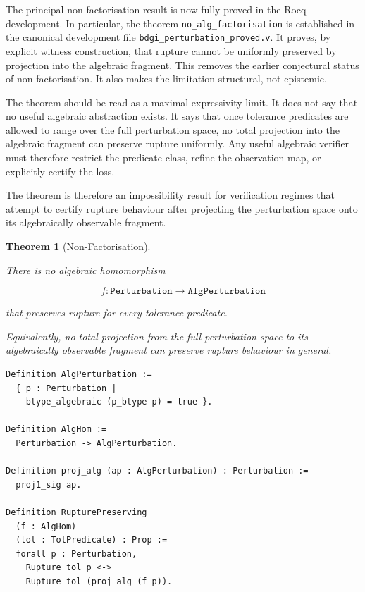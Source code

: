 \documentclass[pdflatex,sn-mathphys-num]{sn-jnl}
\theoremstyle{plain}
\newtheorem{theorem}{Theorem}[section]
\theoremstyle{definition}
\theoremstyle{remark}
\begin{document}
The principal non-factorisation result is now fully proved in the Rocq
development.
In particular, the theorem \texttt{no\_alg\_factorisation} is
established in the canonical development file
\texttt{bdgi\_perturbation\_proved.v}.
It proves, by explicit witness construction, that rupture cannot be
uniformly preserved by projection into the algebraic fragment.
This removes the earlier conjectural status of non-factorisation.
It also makes the limitation structural, not epistemic.

The theorem should be read as a maximal-expressivity limit.
It does not say that no useful algebraic abstraction exists.
It says that once tolerance predicates are allowed to range over the full
perturbation space, no total projection into the algebraic fragment can
preserve rupture uniformly.
Any useful algebraic verifier must therefore restrict the predicate class,
refine the observation map, or explicitly certify the loss.

The theorem is therefore an impossibility result for verification regimes
that attempt to certify rupture behaviour after projecting the
perturbation space onto its algebraically observable fragment.

\begin{theorem}[Non-Factorisation]
\label{thm:nonfact}

There is no algebraic homomorphism

\[
f :
\mathtt{Perturbation}
\to
\mathtt{AlgPerturbation}
\]

that preserves rupture for every tolerance predicate.

Equivalently, no total projection from the full perturbation space to
its algebraically observable fragment can preserve rupture behaviour
in general.

\end{theorem}

\begin{lstlisting}[style=rocq,
caption={Non-factorisation type signature.}]
Definition AlgPerturbation :=
  { p : Perturbation |
    btype_algebraic (p_btype p) = true }.

Definition AlgHom :=
  Perturbation -> AlgPerturbation.

Definition proj_alg (ap : AlgPerturbation) : Perturbation :=
  proj1_sig ap.

Definition RupturePreserving
  (f : AlgHom)
  (tol : TolPredicate) : Prop :=
  forall p : Perturbation,
    Rupture tol p <->
    Rupture tol (proj_alg (f p)).
\end{lstlisting}
\end{document}

